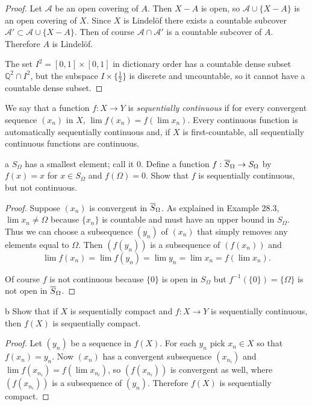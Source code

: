 \documentclass[11pt]{article}
\begin{document}
\begin{proof}
  Let $\mathcal{A}$ be an open covering of $A$. Then $X - A$ is open, so
  $\mathcal{A} \cup \{X - A\}$ is an open covering of $X$. Since $X$ is Lindel{\"o}f there exists a
  countable subcover $\mathcal{A}' \subset \mathcal{A} \cup \{X - A\}$. Then of
  course $\mathcal{A} \cap \mathcal{A}'$ is a countable subcover of $A$.
  Therefore $A$ is Lindel{\"o}f.

  The set $I^2 = [0,1]\times[0,1]$ in dictionary order has a countable dense
  subset $\mathbb{Q}^2 \cap I^2$, but the subspace $I \times \{\frac{1}{2}\}$ is
  discrete and uncountable, so it cannot have a countable dense subset.
\end{proof}


\noindent We say that a function $f : X \to Y$ is \emph{sequentially continuous}
if for every convergent sequence $(x_n)$ in $X$, $\lim f(x_n) = f(\lim x_n)$.
Every continuous function is automatically sequentially continuous and, if $X$
is first-countable, all sequentially continuous functions are continuous.

\begin{p}{a}
  $S_\Omega$ has a smallest element; call it $0$. Define a function $f: { \overline{S} }_\Omega \to S_\Omega$ by $f(x) = x$ for $x \in S_\Omega$ and $f(\Omega) = 0.$
  Show that $f$ is sequentially continuous, but not continuous.
\end{p}
\begin{proof}
  Suppose $(x_n)$ is convergent in ${ \overline{S} }_\Omega$. As explained in Example 28.3,
  $\lim x_n \neq
  \Omega$ because $\{x_n\}$ is countable and must have an upper bound in
  $S_\Omega$. Thus we can choose a subsequence $(y_n)$ of $(x_n)$ that simply
  removes any elements equal to $\Omega$. Then $(f(y_n))$ is a subsequence of
  $(f(x_n))$ and
  \[ \lim f(x_n) = \lim f(y_n) = \lim y_n = \lim x_n = f(\lim x_n).\]

  Of course $f$ is not continuous because $\{0\}$ is open in $S_\Omega$ but
  $f^{-1}(\{0\}) = \{\Omega\}$ is not open in ${ \overline{S} }_\Omega$.
\end{proof}

\begin{p}{b}
  Show that if $X$ is sequentially compact and $f: X \to Y$ is sequentially
  continuous, then $f(X)$ is sequentially compact.
\end{p}
\begin{proof}
  Let $(y_n)$ be a sequence in $f(X)$. For each $y_n$ pick $x_n \in X$ so that
  $f(x_n) = y_n$. Now $(x_n)$ has a convergent subsequence $(x_{n_i})$ and $\lim
  f(x_{n_i}) = f(\lim x_{n_i})$, so $(f(x_{n_i}))$ is convergent as well, where
  $(f(x_{n_i}))$ is a subsequence of $(y_n)$. Therefore $f(X)$ is sequentially
  compact.
\end{proof}
\end{document}

